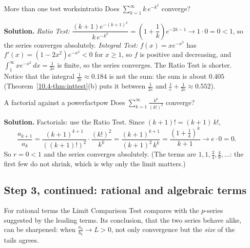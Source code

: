 \documentclass[11pt]{article}
\begin{document}
\begin{exmp}{More than one test works}{intratio}
Does $\displaystyle\sum_{k=1}^\infty k\,e^{-k^2}$ converge?

\textbf{Solution.} \emph{Ratio Test:} $\dfrac{(k+1)e^{-(k+1)^2}}{k\,e^{-k^2}}=\left(1+\dfrac1k\right)e^{-2k-1}\to1\cdot0=0<1$, so the series converges absolutely. \emph{Integral Test:} $f(x)=xe^{-x^2}$ has $f'(x)=(1-2x^2)e^{-x^2}<0$ for $x\ge1$, so $f$ is positive and decreasing, and $\int_1^\infty xe^{-x^2}\,dx=\frac1{2e}$ is finite, so the series converges. The Ratio Test is shorter. Notice that the integral $\frac1{2e}\approx0.184$ is not the sum: the sum is about $0.405$ (Theorem~\ref{10.4-thm:inttest}(b) puts it between $\frac1{2e}$ and $\frac1e+\frac1{2e}\approx0.552$).
\end{exmp}

\begin{exmp}{A factorial against a power}{factpow}
Does $\displaystyle\sum_{k=1}^\infty\frac{k^k}{(k!)^2}$ converge?

\textbf{Solution.} Factorials: use the Ratio Test. Since $(k+1)!=(k+1)\,k!$,
\[
\frac{a_{k+1}}{a_k}=\frac{(k+1)^{k+1}}{\left((k+1)!\right)^2}\cdot\frac{(k!)^2}{k^k}=\frac{(k+1)^{k+1}}{(k+1)^2\,k^k}=\frac{\left(1+\frac1k\right)^k}{k+1}\to e\cdot0=0 .
\]
So $r=0<1$ and the series converges absolutely. (The terms are $1,1,\frac34,\frac49,\dots$: the first few do not shrink, which is why only the limit matters.)
\end{exmp}

\subsection*{Step 3, continued: rational and algebraic terms}

For rational terms the Limit Comparison Test compares with the $p$-series suggested by the leading terms. Its conclusion, that the two series behave alike, can be sharpened: when $\frac{a_k}{b_k}\to L>0$, not only convergence but the \emph{size} of the tails agrees.
\end{document}
